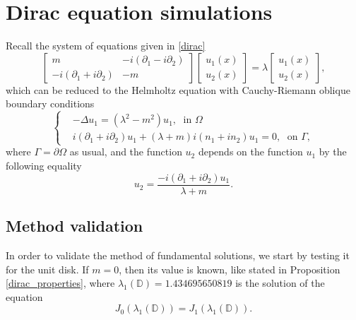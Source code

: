 \label{chap:implement}

\section{Dirac equation simulations}

Recall the system of equations given in \eqref{dirac}
\begin{equation}
    \begin{bmatrix}
        m & -i(\partial_1 - i \partial_2)\\
        -i(\partial_1 + i \partial_2) & -m
    \end{bmatrix}
    \begin{bmatrix}
        u_1(x)\\
        u_2(x)
    \end{bmatrix}
    =\lambda
    \begin{bmatrix}
    u_1(x)\\
    u_2(x)
    \end{bmatrix},
\end{equation}
which can be reduced to the Helmholtz equation with Cauchy-Riemann oblique boundary conditions
\begin{equation*}
    \begin{cases}
        &-\Delta u_1 = (\lambda^2 - m^2)u_1, \; \text{ in } \Omega\\
        & i (\partial_1 + i\partial_2)u_1 + (\lambda + m)i(n_1 + i n_2)u_1 = 0, \; \text{ on } \Gamma,
    \end{cases}      
\end{equation*}
where \(\Gamma = \partial\Omega\) as usual, and the function \(u_2\) depends on the function \(u_1\) by the following equality
\[
    u_2 = \frac{-i (\partial_1 + i\partial_2)u_1}{\lambda + m}.    
\]
\subsection{Method validation}

In order to validate the method of fundamental solutions, we start by testing it for the unit disk. If \(m=0\), then its value is known, like stated in Proposition \ref{dirac_properties}, where \(\lambda_1(\mathbb{D})= 1.434695650819\) is the solution of the equation
\[
    J_0(\lambda_1(\mathbb{D})) = J_1(\lambda_1(\mathbb{D})).
\]

